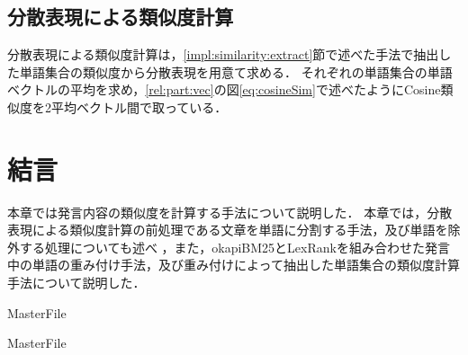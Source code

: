 \subsection{分散表現による類似度計算}
\label{impl:similarity:wordEmbed}
分散表現による類似度計算は，\ref{impl:similarity:extract}節で述べた手法で抽出した単語集合の類似度から分散表現を用意て求める．
それぞれの単語集合の単語ベクトルの平均を求め，\ref{rel:part:vec}の図\ref{eq:cosineSim}で述べたようにCosine類似度を2平均ベクトル間で取っている．
\section{結言}
\label{impl:conclusion}
本章では発言内容の類似度を計算する手法について説明した．
本章では，分散表現による類似度計算の前処理である文章を単語に分割する手法，及び単語を除外する処理についても述べ ，また，okapiBM25とLexRankを組み合わせた発言中の単語の重み付け手法，及び重み付けによって抽出した単語集合の類似度計算手法について説明した．

 \expandafter\ifx\csname MasterFile\endcsname\relax
	\def\BibFile{hoge}
	
  \fi
  \expandafter\ifx\csname MasterFile\endcsname\relax
  
  \fi
